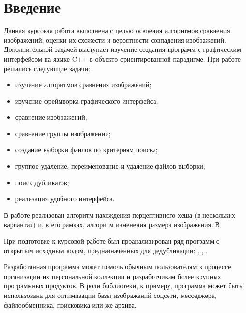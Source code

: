 \documentclass[variant=courcework]{bsuir}
\begin{document}



\tableofcontents

\chapter*{Введение}

Данная курсовая работа выполнена с целью освоения алгоритмов сравнения
изображений, оценки их схожести и вероятности совпадения изображений.
Дополнительной задачей выступает изучение создания программ с графическим
интерфейсом на языке C++ в объекто-ориентированной парадигме. При работе
решались следующие задачи:

\begin{itemize}
    \item изучение алгоритмов сравнения изображений;
    \item изучение фреймворка графического интерфейса;
    \item сравнение изображений;
    \item сравнение группы изображений;
    \item создание выборки файлов по критериям поиска;
    \item группое удаление, переименование и удаление файлов выборки;
    \item поиск дубликатов;
    \item реализация удобного интерфейса.
\end{itemize}

В работе реализован алгоритм нахождения перцептивного хеша (в нескольких
вариантах) и, в его рамках, алгоритм изменения размера изображения. В

При подготовке к курсовой работе был проанализирован ряд программ с открытым
исходным кодом, предназначенных для дедубликации: ,
, .

Разработанная программа может помочь обычным пользователям в процессе
организации их персональной коллекции и разработчикам более крупных программных
продуктов. В роли библиотеки, к примеру, программа может быть использована для
оптимизации базы изображений соцсети, месседжера, файлообменника, поисковика или
же архива.
\end{document}
